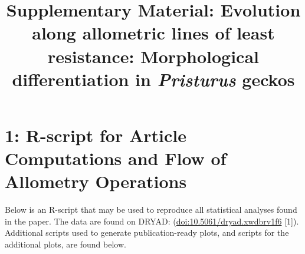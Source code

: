 \documentclass[
  11pt,
]{article}
\title{Supplementary Material: Evolution along allometric lines of least
resistance: Morphological differentiation in \emph{Pristurus} geckos}
\author{}
\date{\vspace{-2.5em}}
\begin{document}
\maketitle

\hypertarget{r-script-for-article-computations-and-flow-of-allometry-operations}{%
\section{1: R-script for Article Computations and Flow of Allometry
Operations}\label{r-script-for-article-computations-and-flow-of-allometry-operations}}

Below is an R-script that may be used to reproduce all statistical
analyses found in the paper. The data are found on DRYAD:
(\url{doi:10.5061/dryad.xwdbrv1f6} {[}1{]}). Additional scripts used to
generate publication-ready plots, and scripts for the additional plots,
are found below.
\end{document}
